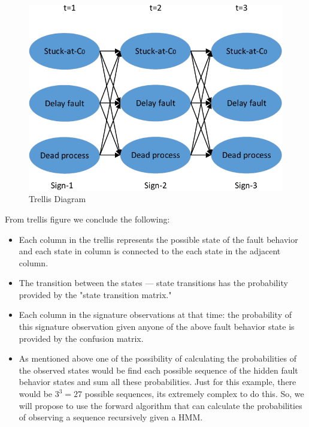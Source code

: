 \begin{figure}[tb!]

 \centering
  \captionsetup{justification=centering}    
   \includegraphics[scale=0.8]{Figures/viterbi.pdf}
   \caption{Trellis Diagram}
\label{fig:trellis}
\end{figure}


From trellis figure we conclude the following:

\begin{itemize}

\item Each column in the trellis represents the possible state of the fault behavior and each state in column is connected to the each state in the adjacent column.

\item The transition between the states --- state transitions has the probability provided by the "state transition matrix."

\item Each column in the signature observations at that time: the probability of this signature observation given anyone of the above fault behavior state is provided by the confusion matrix. 

\item As mentioned above one of the possibility of calculating the probabilities of the observed states would be find each possible sequence of the hidden fault behavior states and sum all these probabilities. Just for this example, there would be $3^3 = 27$ possible sequences, its extremely complex to do this. So, we will propose to use the forward algorithm that can calculate the probabilities of observing a sequence recursively given a HMM.

\end{itemize}


